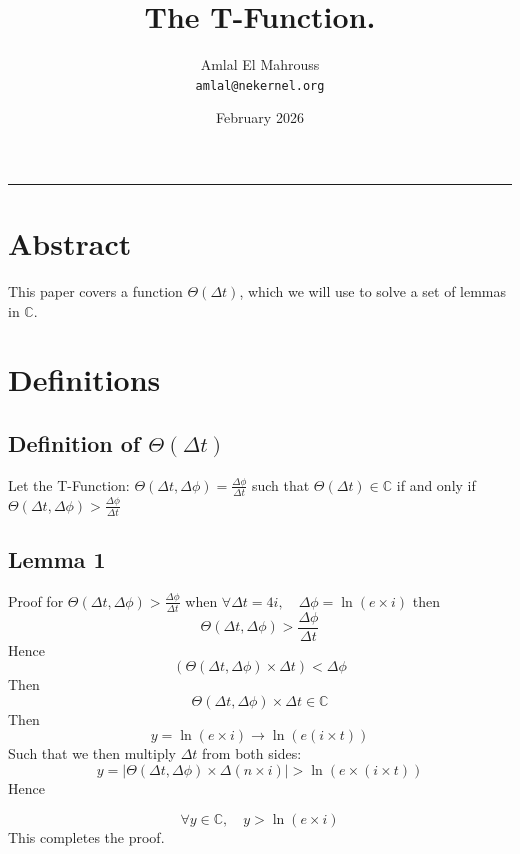 \documentclass[11pt, a4paper]{article}
\title{The T-Function.}
\author{Amlal El Mahrouss\\\texttt{amlal@nekernel.org}}
\date{February 2026}
\begin{document}
\bf \maketitle

\begin{center}
	\rule[0.01cm]{17cm}{0.01cm}
\end{center}

\section{Abstract}
This paper covers a function $\Theta(\Delta t)$, which we will use to solve a set of lemmas in $\mathbb{C}$.

\section{Definitions}

\subsection{Definition of $\Theta(\Delta t)$}
Let the T-Function:
$\Theta(\Delta t, \Delta\phi)=\frac{\Delta\phi}{\Delta t}$
such that $\Theta(\Delta t) \in \mathbb{C}$ if and only if $\Theta(\Delta t, \Delta\phi) > \frac{\Delta\phi}{\Delta t}$

\subsection{Lemma 1}

Proof for $\Theta(\Delta t, \Delta\phi) > \frac{\Delta\phi}{\Delta t}$ when $\forall \Delta t = 4i, \quad \Delta\phi = \ln(e \times i)$ then
\begin{equation}
    \Theta(\Delta t, \Delta\phi) > \frac{\Delta\phi}{{\Delta t}}
\end{equation}
Hence
\begin{equation}
(\Theta(\Delta t, \Delta\phi) \times \Delta t) < \Delta\phi
\end{equation}
Then
\begin{equation}
\Theta(\Delta t, \Delta\phi) \times \Delta t \in \mathbb{C}
\end{equation}
Then
\begin{equation}
y = \ln(e \times i) \to \ln (e(i \times t))
\end{equation}
Such that we then multiply $\Delta t$ from both sides:
\begin{equation}
    y = |\Theta(\Delta t, \Delta\phi) \times \Delta (n \times i)| > \ln (e \times (i \times t))
\end{equation}
Hence

\begin{equation}
    \forall y \in \mathbb{C}, \quad y > \ln(e \times i)
\end{equation}
This completes the proof.
\end{document}
